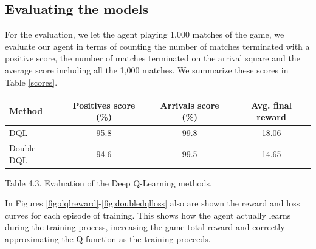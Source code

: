 \documentclass{article}
\begin{document}
\subsection{Evaluating the models}

For the evaluation, we let the agent playing 1,000 matches of the game, we evaluate our agent in terms of counting the number of matches terminated with a positive score, the number of matches terminated on the arrival square and the average score including all the 1,000 matches. We summarize these scores in Table \ref{scores}.

\begin{center}
	\label{scores}
	\begin{tabular}{ |l|c|c|c| } 
		\hline
		Method & Positives score (\%) & Arrivals score (\%) & Avg. final reward \\ 
		\hline
		DQL & 95.8 & 99.8 & 18.06\\ 
		Double DQL  & 94.6 & 99.5 & 14.65\\ 
		\hline
	\end{tabular}
	Table 4.3. Evaluation of the Deep Q-Learning methods.
\end{center}

In Figures \ref{fig:dqlreward}-\ref{fig:doubledqlloss} also are shown the reward and loss curves for each episode of training. This shows how the agent actually learns during the training process, increasing the game total reward and correctly approximating the Q-function as the training proceeds.
\end{document}
